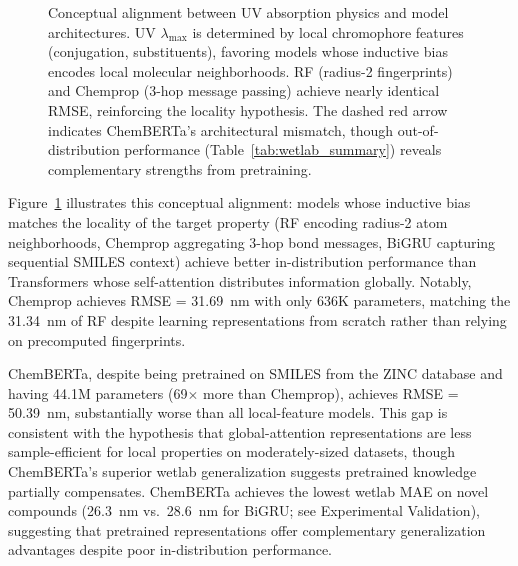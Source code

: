 \begin{figure}[!ht]
    \caption{Conceptual alignment between UV absorption physics and model architectures. UV $\lambda_{\max}$ is determined by local chromophore features (conjugation, substituents), favoring models whose inductive bias encodes local molecular neighborhoods. RF (radius-2 fingerprints) and Chemprop (3-hop message passing) achieve nearly identical RMSE, reinforcing the locality hypothesis. The dashed red arrow indicates ChemBERTa's architectural mismatch, though out-of-distribution performance (Table~\ref{tab:wetlab_summary}) reveals complementary strengths from pretraining.}
    \label{fig:local_vs_global}
\end{figure}

Figure~\ref{fig:local_vs_global} illustrates this conceptual alignment: models whose inductive bias matches the locality of the target property (RF encoding radius-2 atom neighborhoods, Chemprop aggregating 3-hop bond messages, BiGRU capturing sequential SMILES context) achieve better in-distribution performance than Transformers whose self-attention distributes information globally\cite{chenMolecularLanguage2023, jiang2023trangru}.
Notably, Chemprop achieves RMSE = 31.69~nm with only 636K parameters, matching the 31.34~nm of RF despite learning representations from scratch rather than relying on precomputed fingerprints.

ChemBERTa, despite being pretrained on SMILES from the ZINC database and having 44.1M parameters (69$\times$ more than Chemprop), achieves RMSE = 50.39~nm, substantially worse than all local-feature models.
This gap is consistent with the hypothesis that global-attention representations are less sample-efficient for local properties on moderately-sized datasets, though ChemBERTa's superior wetlab generalization suggests pretrained knowledge partially compensates.
ChemBERTa achieves the lowest wetlab MAE on novel compounds (26.3~nm vs.\ 28.6~nm for BiGRU; see Experimental Validation), suggesting that pretrained representations offer complementary generalization advantages despite poor in-distribution performance.

